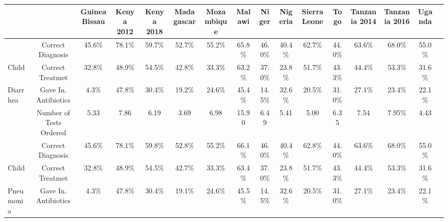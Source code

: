 \def\sym#1{\ifmmode^{#1}\else\(^{#1}\)\fi}
\begin{tabular}{l*{15}{c}}
\hline\hline
         &\multicolumn{1}{c}{}&\multicolumn{1}{c}{Guinea Bissau}&\multicolumn{1}{c}{Kenya 2012}&\multicolumn{1}{c}{Kenya 2018}&\multicolumn{1}{c}{Madagascar}&\multicolumn{1}{c}{Mozambique}&\multicolumn{1}{c}{Malawi}&\multicolumn{1}{c}{Niger}&\multicolumn{1}{c}{Nigeria}&\multicolumn{1}{c}{Sierra Leone}&\multicolumn{1}{c}{Togo}&\multicolumn{1}{c}{Tanzania 2014}&\multicolumn{1}{c}{Tanzania 2016}&\multicolumn{1}{c}{Uganda}&\\
\hline
 &                                     {Correct Diagnosis}&            {45.6\%}&      {78.1\%}&      {59.7\%}&      {52.7\%}&      {55.2\%}&      {65.8\%}&      {46.0\%}&      {40.4\%}&      {62.7\%}&      {44.0\%}&     {63.6\%}&     {68.0\%}&     {55.0\%}\\
Child&                                 {Correct Treatmet}&             {32.8\%}&      {48.9\%}&      {54.5\%}&      {42.8\%}&  {33.3\%}&  {63.2\%}&      {37.0\%}&      {23.8\%}&      {51.7\%}&      {43.3\%}&     {44.4\%}&     {53.3\%}&     {31.6\%}\\
Diarrhea&                      {Gave In. Antibiotics}&         {4.3\%}&      {47.8\%}&  {30.4\%}&  {19.2\%}&      {24.6\%}&      {45.4\%}&      {14.5\%}&      {32.6\%}&      {20.5\%}&      {31.0\%}&     {27.1\%}&     {23.4\%}&     {22.1\%}\\
 &                                     {Number of Tests Ordered}&  {5.33}&    {7.86}&    {6.19}&    {3.69}&        {6.98}&        {15.90}&        {6.49}&        {5.41}&        {5.00}&        {6.35}&       {7.54}&       {7.95\%}&     {4.43}\\
\hline
 &                                     {Correct Diagnosis}&            {45.6\%}&      {78.1\%}&  {59.8\%}&  {52.8\%}&      {55.2\%}&      {66.1\%}&      {46.0\%}&      {40.4\%}&      {62.8\%}&      {44.0\%}&     {63.6\%}&     {68.0\%}&     {55.0\%}\\
Child&                         {Correct Treatmet}&             {32.8\%}&      {48.9\%}&      {54.5\%}&      {42.7\%}&      {33.3\%}&      {63.4\%}&      {37.0\%}&      {23.8\%}&      {51.7\%}&      {43.3\%}&     {44.4\%}&     {53.3\%}&     {31.6\%}\\
Pneumonia&                     {Gave In. Antibiotics}&         {4.3\%}&      {47.8\%}&  {30.4\%}&  {19.1\%}&      {24.6\%}&      {45.5\%}&      {14.5\%}&      {32.6\%}&      {20.5\%}&      {31.0\%}&     {27.1\%}&     {23.4\%}&     {22.1\%}\\

\end{tabular}
